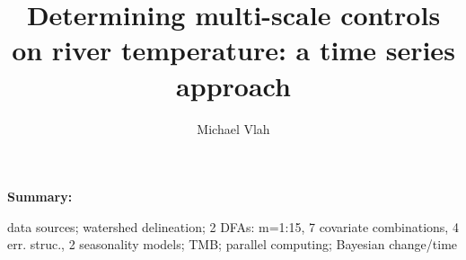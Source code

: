 \documentclass[notitlepage]{article}
\author{Michael Vlah}
\title{Determining multi-scale controls on river temperature: a time series approach}
\begin{document}

\maketitle
\vspace{10pc}
\noindent
\textbf{Summary:}

 data sources; watershed delineation; 2 DFAs: m=1:15, 7 covariate combinations, 4 err. struc., 2 seasonality models; TMB; parallel computing; Bayesian change/time
\clearpage
{}
\end{document}
